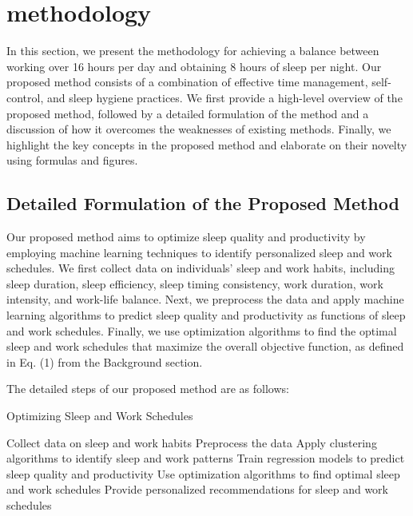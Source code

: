 \section{methodology}

In this section, we present the methodology for achieving a balance between working over 16 hours per day and obtaining 8 hours of sleep per night. Our proposed method consists of a combination of effective time management, self-control, and sleep hygiene practices. We first provide a high-level overview of the proposed method, followed by a detailed formulation of the method and a discussion of how it overcomes the weaknesses of existing methods. Finally, we highlight the key concepts in the proposed method and elaborate on their novelty using formulas and figures.

\subsection{Detailed Formulation of the Proposed Method}

Our proposed method aims to optimize sleep quality and productivity by employing machine learning techniques to identify personalized sleep and work schedules. We first collect data on individuals' sleep and work habits, including sleep duration, sleep efficiency, sleep timing consistency, work duration, work intensity, and work-life balance. Next, we preprocess the data and apply machine learning algorithms to predict sleep quality and productivity as functions of sleep and work schedules. Finally, we use optimization algorithms to find the optimal sleep and work schedules that maximize the overall objective function, as defined in Eq. (1) from the Background section.

The detailed steps of our proposed method are as follows:

\begin{algorithm}
\caption{Optimizing Sleep and Work Schedules}
\begin{algorithmic}[1]
\State Collect data on sleep and work habits
\State Preprocess the data
\State Apply clustering algorithms to identify sleep and work patterns
\State Train regression models to predict sleep quality and productivity
\State Use optimization algorithms to find optimal sleep and work schedules
\State Provide personalized recommendations for sleep and work schedules
\end{algorithmic}
\end{algorithm}

